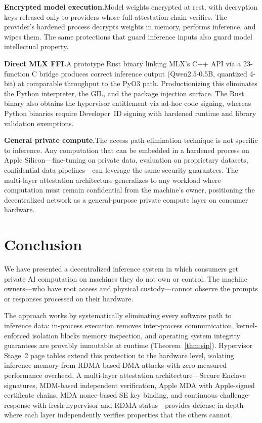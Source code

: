 \documentclass[10pt,twocolumn,letterpaper]{article}
\begin{document}
\textbf{Encrypted model execution.}\quad Model weights encrypted at rest, with decryption keys released only to providers whose full attestation chain verifies. The provider's hardened process decrypts weights in memory, performs inference, and wipes them. The same protections that guard inference inputs also guard model intellectual property.

\textbf{Direct MLX FFI.}\quad A prototype Rust binary linking MLX's C++ API via a 23-function C bridge produces correct inference output (Qwen2.5-0.5B, quantized 4-bit) at comparable throughput to the PyO3 path. Productionizing this eliminates the Python interpreter, the GIL, and the package injection surface. The Rust binary also obtains the hypervisor entitlement via ad-hoc code signing, whereas Python binaries require Developer~ID signing with hardened runtime and library validation exemptions.

\textbf{General private compute.}\quad The access path elimination technique is not specific to inference. Any computation that can be embedded in a hardened process on Apple Silicon---fine-tuning on private data, evaluation on proprietary datasets, confidential data pipelines---can leverage the same security guarantees. The multi-layer attestation architecture generalizes to any workload where computation must remain confidential from the machine's owner, positioning the decentralized network as a general-purpose private compute layer on consumer hardware.

\section{Conclusion}
\label{sec:conclusion}

We have presented a decentralized inference system in which consumers get private AI computation on machines they do not own or control. The machine owners---who have root access and physical custody---cannot observe the prompts or responses processed on their hardware.

The approach works by systematically eliminating every software path to inference data: in-process execution removes inter-process communication, kernel-enforced isolation blocks memory inspection, and operating system integrity guarantees are provably immutable at runtime (Theorem~\ref{thm:sip}). Hypervisor Stage~2 page tables extend this protection to the hardware level, isolating inference memory from RDMA-based DMA attacks with zero measured performance overhead. A multi-layer attestation architecture---Secure Enclave signatures, MDM-based independent verification, Apple MDA with Apple-signed certificate chains, MDA nonce-based SE key binding, and continuous challenge-response with fresh hypervisor and RDMA status---provides defense-in-depth where each layer independently verifies properties that the others cannot.
\end{document}
